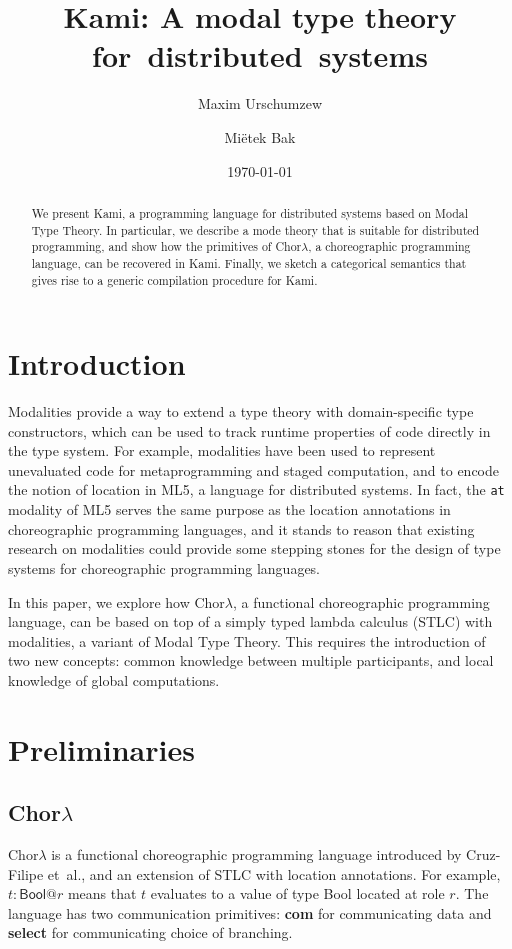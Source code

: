 \documentclass{scrartcl}
\title{Kami: A modal type theory for~distributed~systems}
\author{Maxim Urschumzew \and Miëtek Bak}
\date{\today}
\theoremstyle{definition}
\theoremstyle{plain}
\newcommand{\primitive}[1]{\textsf{\textbf{#1}}}
\begin{document}
\maketitle
\begin{abstract}\noindent
  We present Kami, a programming language for distributed systems based on
  Modal Type Theory\cite{gratzer2023syntax}. In particular, we describe a mode
  theory that is suitable for distributed programming, and show how the
  primitives of Chor$\lambda$\cite{cruz2022functional}, a choreographic
  programming language, can be recovered in Kami. Finally, we sketch a
  categorical semantics that gives rise to a generic compilation procedure for
  Kami.
\end{abstract}

\section{Introduction}
Modalities provide a way to extend a type theory with domain-specific type
constructors, which can be used to track runtime properties of code directly in
the type system. For example, modalities have been used to represent
unevaluated code for metaprogramming and staged
computation\cite{davies2001modal}, and to encode the notion of location in
ML5\cite{murphy2008modal}, a language for distributed systems. In fact, the
\texttt{at} modality of ML5 serves the same purpose as the location annotations
in choreographic programming languages\cite{cruz2022functional,
giallorenzo2024choral}, and it stands to reason that existing research on
modalities could provide some stepping stones for the design of type systems
for choreographic programming languages.

In this paper, we explore how Chor$\lambda$\cite{cruz2022functional}, a
functional choreographic programming language, can be based on top of a simply
typed lambda calculus (STLC) with modalities, a variant of Modal Type
Theory\cite{gratzer2023syntax}. This requires the introduction of two new
concepts: common knowledge between multiple participants, and local knowledge
of global computations.

\section{Preliminaries}
\subsection{\texorpdfstring{Chor$\lambda$}{ChorLambda}}
Chor$\lambda$\cite{cruz2022functional} is a functional choreographic
programming language introduced by Cruz-Filipe et~al., and an extension of STLC
with location annotations. For example, $t : \textsf{Bool} @ r$ means that $t$
evaluates to a value of type \textsf{Bool} located at role $r$. The language
has two communication primitives: \primitive{com} for communicating data and
\primitive{select} for communicating choice of branching.
\end{document}
